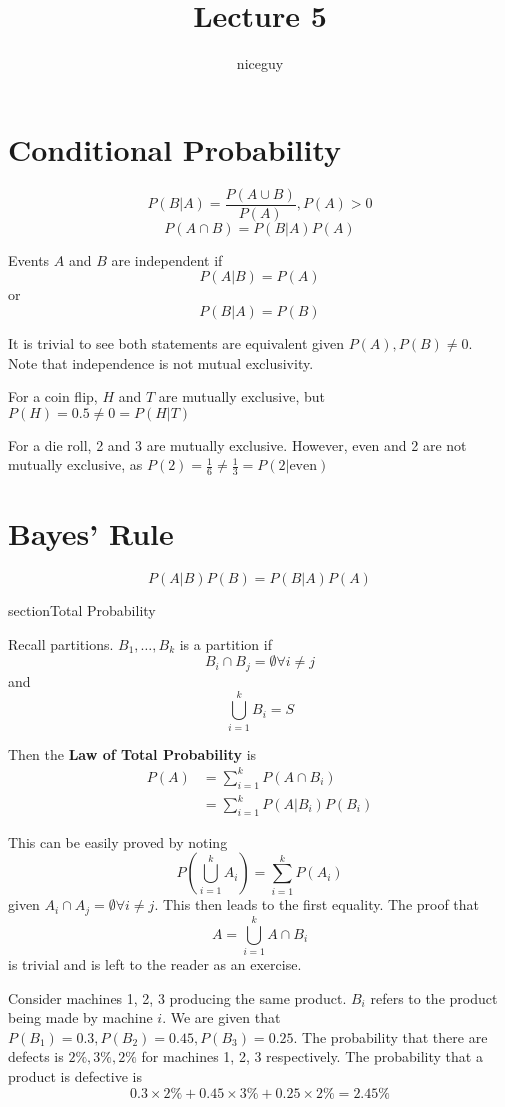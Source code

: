 \documentclass[12pt]{article}
\author{niceguy}
\title{Lecture 5}
\begin{document}
\maketitle

\section{Conditional Probability}

$$P(B|A) = \frac{P(A\cup B)}{P(A)}, P(A)>0$$
$$P(A\cap B) = P(B|A)P(A)$$

\begin{defn}
	Events $A$ and $B$ are independent if
	$$P(A|B) = P(A)$$
	or
	$$P(B|A) = P(B)$$
\end{defn}

It is trivial to see both statements are equivalent given $P(A),P(B)\neq0$. \\
Note that independence is not mutual exclusivity.

\begin{ex}
	For a coin flip, $H$ and $T$ are mutually exclusive, but $P(H) = 0.5 \neq 0 = P(H|T)$
\end{ex}

\begin{ex}
	For a die roll, 2 and 3 are mutually exclusive. However, even and 2 are not mutually exclusive, as $P(2) = \frac{1}{6} \neq \frac{1}{3} = P(2|\text{even})$
\end{ex}

\section{Bayes' Rule}
$$P(A|B)P(B) = P(B|A)P(A)$$

section{Total Probability}

Recall partitions. $B_1,\dots,B_k$ is a partition if
$$B_i\cap B_j=\emptyset\forall i\neq j$$
and
$$\bigcup_{i=1}^k B_i = S$$

Then the \textbf{Law of Total Probability} is
\begin{align*}
	P(A) &= \sum_{i=1}^k P(A\cap B_i) \\
	     &= \sum_{i=1}^k P(A|B_i)P(B_i)
\end{align*}

This can be easily proved by noting
$$P\left(\bigcup_{i=1}^k A_i\right) = \sum_{i=1}^kP(A_i)$$
given $A_i\cap A_j=\emptyset\forall i\neq j$. This then leads to the first equality. The proof that
$$A = \bigcup_{i=1}^k A\cap B_i$$
is trivial and is left to the reader as an exercise.

\begin{ex}
	Consider machines 1, 2, 3 producing the same product. $B_i$ refers to the product being made by machine $i$. We are given that $P(B_1) = 0.3, P(B_2) = 0.45, P(B_3) = 0.25$. The probability that there are defects is $2\%,3\%,2\%$ for machines 1, 2, 3 respectively. The probability that a product is defective is
	$$0.3\times2\% + 0.45\times3\% + 0.25\times2\% = 2.45\%$$
\end{ex}
\end{document}
